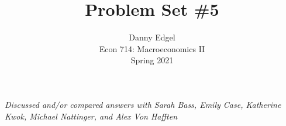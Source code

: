 \documentclass{article}
\begin{document}
\title{	Problem Set \#5 }
\author{ 	Danny Edgel 					\\ 
			Econ 714: Macroeconomics II		\\
			Spring 2021						\\
		}
\maketitle\thispagestyle{empty}


\noindent\textit{Discussed and/or compared answers with Sarah Bass, Emily Case, Katherine Kwok, Michael Nattinger, and Alex Von Hafften}
 \\

\end{document}
